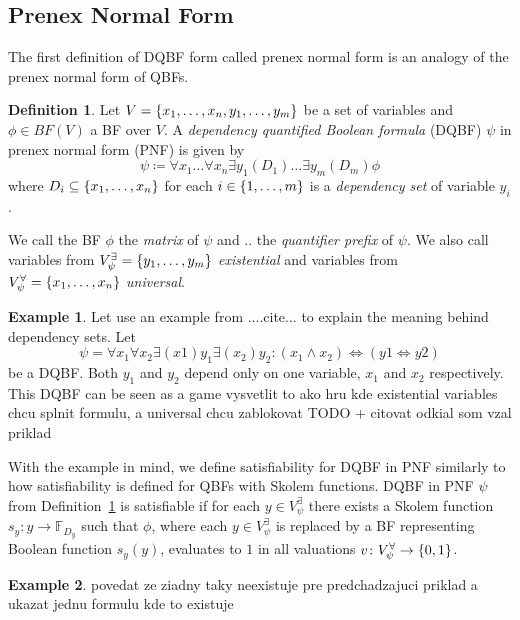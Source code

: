 \documentclass[
  digital, %
  twoside, %
  table,   %
  nolof,     %
  nolot,     %
]{fithesis3}
\let\setbuilder\set
\newcommand{\simpleset}[1]{\{{#1}\}}
\renewcommand{\set}[1]{\normalexpandarg\IfSubStr{#1}{|}{\setbuilder{#1}}{\simpleset{#1}}}
\theoremstyle{definition}
\newtheorem{definition}{Definition}
\newtheorem{example}{Example}
\theoremstyle{remark}
\newcommand{\BF}[1]{BF(#1)}
\newcommand{\BFuncs}[1]{\mathbb{F}_{#1}}
\newcommand{\evars}[1]{V_{#1}^{\exists}}
\newcommand{\uvars}[1]{V_{#1}^{\forall}}
\begin{document}
\subsection{Prenex Normal Form}
The first definition of DQBF form called prenex normal form is an analogy of the prenex normal form of QBFs.


\begin{definition}
  Let $V = \set{x_1, \dots, x_n, y_1, \dots, y_m}$ be a set of variables and $\phi \in \BF{V}$ a BF over $V$. A \emph{dependency quantified Boolean formula} (DQBF) $\psi$ in prenex normal form (PNF) is given by
  \[\psi \coloneqq \forall x_1 \dots \forall x_n \exists y_1 (D_1) \dots \exists y_m (D_m) \phi\]
  where $D_i \subseteq \set{x_1, \dots, x_n}$ for each $i \in \set{1,\dots,m}$ is a \emph{dependency set} of variable $y_i$.
  \label{def:DQBF:PNF}
\end{definition}
We call the BF $\phi$ the \emph{matrix} of $\psi$ and .. the \emph{quantifier prefix} of $\psi$. We also call variables from $\evars{\psi} = \set{y_1,\dots,y_m}$ \emph{existential} and variables from $\uvars{\psi} = \set{x_1,\dots,x_n}$ \emph{universal}.

\begin{example}
Let use an example from ....cite... to explain the meaning behind dependency sets. Let 
\[\psi = \forall x_1 \forall x_2 \exists (x1) y_1 \exists (x_2) y_2 : (x_1 \land x_2) \iff (y1 \iff y2)\]
be a DQBF. Both $y_1$ and $y_2$ depend only on one variable, $x_1$ and $x_2$ respectively. This DQBF can be seen as a game  vysvetlit to ako hru kde existential variables chcu splnit formulu, a universal chcu zablokovat TODO + citovat odkial som vzal priklad
\end{example}

With the example in mind, we define satisfiability for DQBF in PNF similarly to how satisfiability is defined for QBFs with Skolem functions. DQBF in PNF $\psi$ from Definition~\ref{def:DQBF:PNF} is satisfiable if for each $y \in \evars{\psi}$ there exists a Skolem function $s_y\colon y \to \BFuncs{D_y}$ such that $\phi$, where each $y \in \evars{\psi}$ is replaced by a BF representing Boolean function $s_y(y)$, evaluates to $1$ in all valuations $v\colon \uvars{\psi} \to \set{0,1}$.

\begin{example}
povedat ze ziadny taky neexistuje pre predchadzajuci priklad a ukazat jednu formulu kde to existuje
\end{example}
\end{document}

